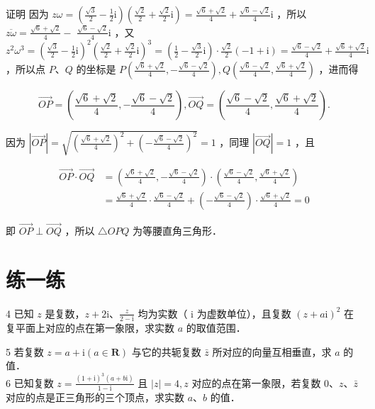 \documentclass[10pt]{article}
\begin{document}
证明 因为 \(z \omega=\left(\frac{\sqrt{3}}{2}-\frac{1}{2} \mathrm{i}\right)\left(\frac{\sqrt{2}}{2}+\frac{\sqrt{2}}{2} \mathrm{i}\right)=\frac{\sqrt{6}+\sqrt{2}}{4}+\frac{\sqrt{6}-\sqrt{2}}{4} \mathrm{i}\) ，所以 \(\overline{z \omega}=\frac{\sqrt{6}+\sqrt{2}}{4}-\) \(\frac{\sqrt{6}-\sqrt{2}}{4} \mathrm{i}\) ，又 \(z^{2} \omega^{3}=\left(\frac{\sqrt{3}}{2}-\frac{1}{2} \mathrm{i}\right)^{2}\left(\frac{\sqrt{2}}{2}+\frac{\sqrt{2}}{2} \mathrm{i}\right)^{3}=\left(\frac{1}{2}-\frac{\sqrt{3}}{2} \mathrm{i}\right) \cdot \frac{\sqrt{2}}{2}(-1+\mathrm{i})=\frac{\sqrt{6}-\sqrt{2}}{4}+\frac{\sqrt{6}+\sqrt{2}}{4} \mathrm{i}\) ，所以点 \(P 、 Q\) 的坐标是 \(P\left(\frac{\sqrt{6}+\sqrt{2}}{4},-\frac{\sqrt{6}-\sqrt{2}}{4}\right), Q\left(\frac{\sqrt{6}-\sqrt{2}}{4}, \frac{\sqrt{6}+\sqrt{2}}{4}\right)\) ，进而得

\[
\overrightarrow{O P}=\left(\frac{\sqrt{6}+\sqrt{2}}{4},-\frac{\sqrt{6}-\sqrt{2}}{4}\right), \overrightarrow{O Q}=\left(\frac{\sqrt{6}-\sqrt{2}}{4}, \frac{\sqrt{6}+\sqrt{2}}{4}\right) .
\]

因为 \(|\overrightarrow{O P}|=\sqrt{\left(\frac{\sqrt{6}+\sqrt{2}}{4}\right)^{2}+\left(-\frac{\sqrt{6}-\sqrt{2}}{4}\right)^{2}}=1\) ，同理 \(|\overrightarrow{O Q}|=1\) ，且

\[
\begin{aligned}
\overrightarrow{O P} \cdot \overrightarrow{O Q} & =\left(\frac{\sqrt{6}+\sqrt{2}}{4},-\frac{\sqrt{6}-\sqrt{2}}{4}\right) \cdot\left(\frac{\sqrt{6}-\sqrt{2}}{4}, \frac{\sqrt{6}+\sqrt{2}}{4}\right) \\
& =\frac{\sqrt{6}+\sqrt{2}}{4} \cdot \frac{\sqrt{6}-\sqrt{2}}{4}+\left(-\frac{\sqrt{6}-\sqrt{2}}{4}\right) \cdot \frac{\sqrt{6}+\sqrt{2}}{4}=0
\end{aligned}
\]

即 \(\overrightarrow{O P} \perp \overrightarrow{O Q}\) ，所以 \(\triangle O P Q\) 为等腰直角三角形．

\section*{练一练}
4 已知 \(z\) 是复数，\(z+2 \mathrm{i} 、 \frac{z}{2-\mathrm{i}}\) 均为实数（ i 为虚数单位），且复数 \((z+a \mathrm{i})^{2}\) 在复平面上对应的点在第一象限，求实数 \(a\) 的取值范围．

5 若复数 \(z=a+\mathrm{i}(a \in \mathbf{R})\) 与它的共轭复数 \(\bar{z}\) 所对应的向量互相垂直，求 \(a\) 的值．\\
6 已知复数 \(z=\frac{(1+\mathrm{i})^{3}(a+b \mathrm{i})}{1-\mathrm{i}}\) 且 \(|z|=4, z\) 对应的点在第一象限，若复数 \(0 、 z 、 \bar{z}\) 对应的点是正三角形的三个顶点，求实数 \(a 、 b\) 的值．
\end{document}
